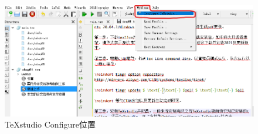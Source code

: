 \begin{figure}[htbp] 
	\centering
	\includegraphics[width=1\textwidth]{image/chap01/texstudio1.png}
	\caption{TeXstudio Configure位置}
	\label{fig:texstudio1}
\end{figure}